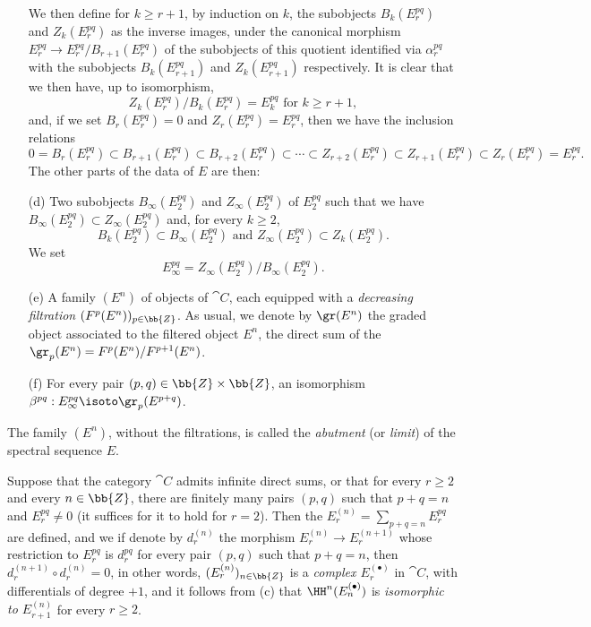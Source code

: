 \begin{env}[11.1.1]
\begin{enumerate}
  We then define for $k\geq r+1$, by induction on $k$, the subobjects $B_k(E_r^{pq})$ and $Z_k(E_r^{pq})$ as the inverse images, under the canonical morphism $E_r^{pq}\to E_r^{pq}/B_{r+1}(E_r^{pq})$ of the subobjects of this quotient identified via $\alpha_r^{pq}$ with the subobjects $B_k(E_{r+1}^{pq})$ and $Z_k(E_{r+1}^{pq})$ respectively.
It is clear that we then have, up to isomorphism,
  \[
  \label{0.11.1.1.1}
    Z_k(E_r^{pq})/B_k(E_r^{pq})=E_k^{pq}\text{ for }k\geq r+1,
    \tag{11.1.1.1}
  \]
  and, if we set $B_r(E_r^{pq})=0$ and $Z_r(E_r^{pq})=E_r^{pq}$, then we have the inclusion relations
  \[
  \label{0.11.1.1.2}
    0=B_r(E_r^{pq})\subset B_{r+1}(E_r^{pq})\subset B_{r+2}(E_r^{pq})\subset\cdots\subset Z_{r+2}(E_r^{pq})\subset Z_{r+1}(E_r^{pq})\subset Z_r(E_r^{pq})=E_r^{pq}.
    \tag{11.1.1.1.2}
  \]
  The other parts of the data of $E$ are then:
  \item[(d)] Two subobjects $B_\infty(E_2^{pq})$ and $Z_\infty(E_2^{pq})$ of $E_2^{pq}$ such that we have $B_\infty(E_2^{pq})\subset Z_\infty(E_2^{pq})$ and, for every $k\geq 2$,
    \[
      B_k(E_2^{pq})\subset B_\infty(E_2^{pq})\text{ and }Z_\infty(E_2^{pq})\subset Z_k(E_2^{pq}).
    \]
    We set
    \[
    \label{0.11.1.1.3}
      E_\infty^{pq}=Z_\infty(E_2^{pq})/B_\infty(E_2^{pq}).
      \tag{11.1.1.1.3}
    \]
  \item[(e)]
    A family $(E^n)$ of objects of $\cat{C}$, each equipped with a \emph{decreasing filtration $(F^p(E^n))_{p\in\bb{Z}}$}.
    As usual, we denote by $\gr(E^n)$ the graded object associated to the filtered object $E^n$, the direct sum of the $\gr_p(E^n)=F^p(E^n)/F^{p+1}(E^n)$.
  \item[(f)] For every pair $(p,q)\in\bb{Z}\times\bb{Z}$, an isomorphism $\beta^{pq}:E_\infty^{pq}\isoto\gr_p(E^{p+q})$.
\end{enumerate}

The family $(E^n)$, without the filtrations, is called the \emph{abutment} (or \emph{limit}) of the spectral sequence $E$.

Suppose that the category $\cat{C}$ admits infinite direct sums, or that for every $r\geq 2$ and every $n\in\bb{Z}$, there are finitely many pairs $(p,q)$ such that $p+q=n$ and $E_r^{pq}\neq 0$ (it suffices for it to hold for $r=2$).
Then the $E_r^{(n)}=\sum_{p+q=n}E_r^{pq}$ are defined, and we if denote by $d_r^{(n)}$ the morphism $E_r^{(n)}\to E_r^{(n+1)}$ whose restriction to $E_r^{pq}$ is $d_r^{pq}$ for every pair $(p,q)$ such that $p+q=n$, then $d_r^{(n+1)}\circ d_r^{(n)}=0$, in other words, $(E_r^{(n)})_{n\in\bb{Z}}$ is a \emph{complex $E_r^{(\bullet)}$} in $\cat{C}$, with differentials of degree $+1$, and it follows from (c) that $\HH^n(E_n^{(\bullet)})$ is \emph{isomorphic to $E_{r+1}^{(n)}$} for every $r\geq 2$.
\end{env}

